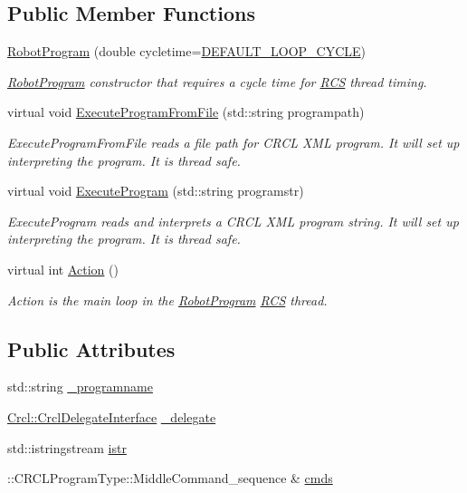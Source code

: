 \subsection*{Public Member Functions}
\begin{DoxyCompactItemize}
\item 
\hyperlink{classRCS_1_1RobotProgram_a9704d21c4a2d24fc856fad7af6e99903}{Robot\-Program} (double cycletime=\hyperlink{RCS_8h_a226eb3a426e9df46b88c4ba34f217203}{D\-E\-F\-A\-U\-L\-T\-\_\-\-L\-O\-O\-P\-\_\-\-C\-Y\-C\-L\-E})
\begin{DoxyCompactList}\small\item\em \hyperlink{classRCS_1_1RobotProgram}{Robot\-Program} constructor that requires a cycle time for \hyperlink{namespaceRCS}{R\-C\-S} thread timing. \end{DoxyCompactList}\item 
virtual void \hyperlink{classRCS_1_1RobotProgram_acc1276c48a841ee5378bf58c1c8f04a2}{Execute\-Program\-From\-File} (std\-::string programpath)
\begin{DoxyCompactList}\small\item\em Execute\-Program\-From\-File reads a file path for C\-R\-C\-L X\-M\-L program. It will set up interpreting the program. It is thread safe. \end{DoxyCompactList}\item 
virtual void \hyperlink{classRCS_1_1RobotProgram_ade00f05303f43f97758cb91de8b4838b}{Execute\-Program} (std\-::string programstr)
\begin{DoxyCompactList}\small\item\em Execute\-Program reads and interprets a C\-R\-C\-L X\-M\-L program string. It will set up interpreting the program. It is thread safe. \end{DoxyCompactList}\item 
virtual int \hyperlink{classRCS_1_1RobotProgram_aeb1eb2140a7dddf6bb6609fbdcff290c}{Action} ()
\begin{DoxyCompactList}\small\item\em Action is the main loop in the \hyperlink{classRCS_1_1RobotProgram}{Robot\-Program} \hyperlink{namespaceRCS}{R\-C\-S} thread. \end{DoxyCompactList}\end{DoxyCompactItemize}
\subsection*{Public Attributes}
\begin{DoxyCompactItemize}
\item 
std\-::string \hyperlink{classRCS_1_1RobotProgram_aca7d780729e20c6d4e3988883b87527d}{\-\_\-programname}
\item 
\hyperlink{classCrcl_1_1CrclDelegateInterface}{Crcl\-::\-Crcl\-Delegate\-Interface} \hyperlink{classRCS_1_1RobotProgram_addf6e9d586d1fde1aa2b8105268d9e66}{\-\_\-delegate}
\item 
std\-::istringstream \hyperlink{classRCS_1_1RobotProgram_a0099964c452870619bd0ee7651ffb072}{istr}
\item 
\-::C\-R\-C\-L\-Program\-Type\-::\-Middle\-Command\-\_\-sequence \& \hyperlink{classRCS_1_1RobotProgram_ad6ed8ea72249e836521b2f7d7feb3523}{cmds}
\end{DoxyCompactItemize}
